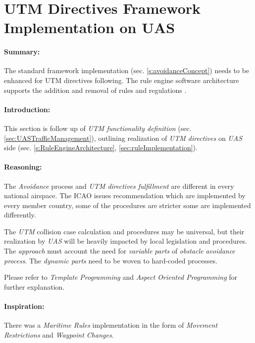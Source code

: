 \cleardoublepage
\section[UTM Directives Framework Implementation on UAS]{UTM Directives Framework\\ Implementation on UAS}\label{sec:ruleEngine}

\paragraph{Summary:} The standard framework implementation (sec. \ref{s:avoidanceConcept}) needs to be enhanced for UTM directives following. The rule engine software architecture supports the addition and removal of rules and regulations .

\paragraph{Introduction:} This section is follow up of \emph{UTM functionality definition} (sec. \ref{sec:UASTrafficManagement}), outlining realization of \emph{UTM directives} on \emph{UAS} side (sec. \ref{s:RuleEngineArchitecture},  \ref{sec:ruleImplementation}).

\paragraph{Reasoning:} The \emph{Avoidance} process and \emph{UTM directives fulfillment} are different in every national airspace. The ICAO issues recommendation \cite{icao4444,icaoAnnex2} which are implemented by every member country, some of the procedures are stricter some are implemented differently.

The \emph{UTM} collision case calculation and procedures may be universal, but their realization by \emph{UAS} will be heavily impacted by local legislation and procedures.  The \emph{approach} must account the need for \emph{variable parts} of \emph{obstacle avoidance process}. The \emph{dynamic parts} need to be woven to hard-coded processes. 

\begin{note}
	Please refer to \emph{Template Programming} and \emph{Aspect Oriented Programming} for further explanation.
\end{note}

\paragraph{Inspiration:} There was a \emph{Maritime Rules} implementation \cite{benjamin2006navigation} in the form of \emph{Movement Restrictions} and \emph{Waypoint Changes}.
